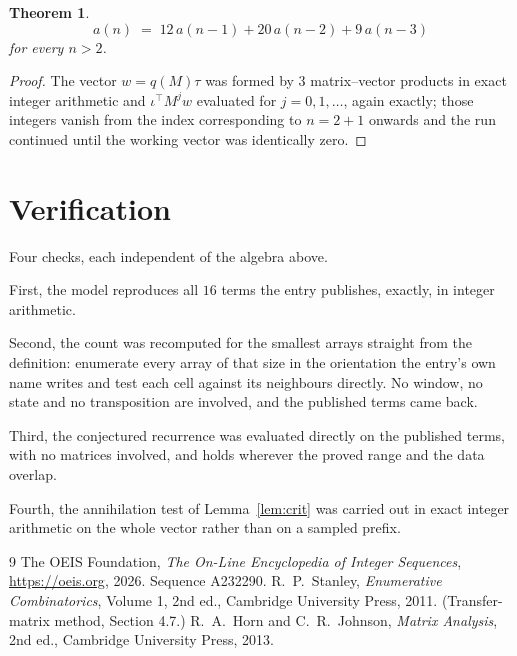 \documentclass[11pt,a4paper]{article}
\theoremstyle{plain}
\newtheorem{theorem}{Theorem}
\theoremstyle{definition}
\begin{document}
\begin{theorem}
\[
a(n)\;=\;12\,a(n-1) + 20\,a(n-2) + 9\,a(n-3)
\]
for every $n>2$.
\end{theorem}

\begin{proof}
The vector $w=q(M)\tau$ was formed by $3$ matrix--vector products in exact integer
arithmetic and $\iota^{\!\top}M^{j}w$ evaluated for $j=0,1,\dots$, again exactly; those
integers vanish from the index corresponding to $n=2+1$ onwards and the run continued
until the working vector was identically zero.
\end{proof}

\section{Verification}

Four checks, each independent of the algebra above.

First, the model reproduces all $16$ terms the entry publishes, exactly, in integer
arithmetic.

Second, the count was recomputed for the smallest arrays straight from the definition:
enumerate every array of that size in the orientation the entry's own name writes and test each
cell against its neighbours directly. No window, no state and no transposition are involved,
and the published terms came back.

Third, the conjectured recurrence was evaluated directly on the published terms, with no
matrices involved, and holds wherever the proved range and the data overlap.

Fourth, the annihilation test of Lemma~\ref{lem:crit} was carried out in exact integer
arithmetic on the whole vector rather than on a sampled prefix.

\begin{thebibliography}{9}
 The OEIS Foundation, \emph{The On-Line Encyclopedia of Integer
Sequences}, \url{https://oeis.org}, 2026. Sequence A232290.
 R.~P.~Stanley, \emph{Enumerative Combinatorics}, Volume 1, 2nd ed.,
Cambridge University Press, 2011. (Transfer-matrix method, Section 4.7.)
 R.~A.~Horn and C.~R.~Johnson, \emph{Matrix Analysis}, 2nd ed., Cambridge
University Press, 2013.
\end{thebibliography}
\end{document}
